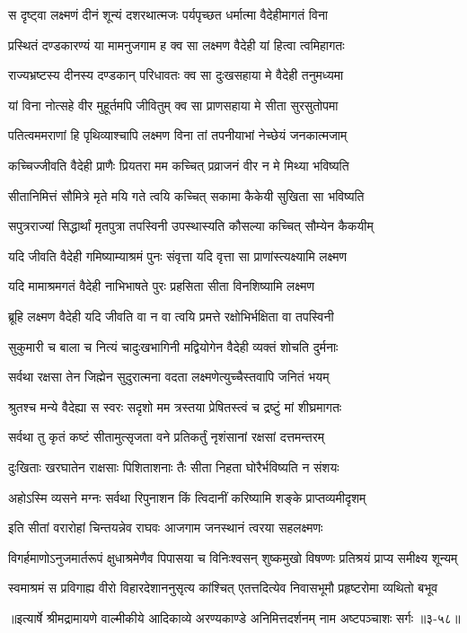 
\twolineshloka
{स दृष्ट्वा लक्ष्मणं दीनं शून्यं दशरथात्मजः}
{पर्यपृच्छत धर्मात्मा वैदेहीमागतं विना} %

\twolineshloka
{प्रस्थितं दण्डकारण्यं या मामनुजगाम ह}
{क्व सा लक्ष्मण वैदेही यां हित्वा त्वमिहागतः} %

\twolineshloka
{राज्यभ्रष्टस्य दीनस्य दण्डकान् परिधावतः}
{क्व सा दुःखसहाया मे वैदेही तनुमध्यमा} %

\twolineshloka
{यां विना नोत्सहे वीर मुहूर्तमपि जीवितुम्}
{क्व सा प्राणसहाया मे सीता सुरसुतोपमा} %

\twolineshloka
{पतित्वममराणां हि पृथिव्याश्चापि लक्ष्मण}
{विना तां तपनीयाभां नेच्छेयं जनकात्मजाम्} %

\twolineshloka
{कच्चिज्जीवति वैदेही प्राणैः प्रियतरा मम}
{कच्चित् प्रव्राजनं वीर न मे मिथ्या भविष्यति} %

\twolineshloka
{सीतानिमित्तं सौमित्रे मृते मयि गते त्वयि}
{कच्चित् सकामा कैकेयी सुखिता सा भविष्यति} %

\twolineshloka
{सपुत्रराज्यां सिद्धार्थां मृतपुत्रा तपस्विनी}
{उपस्थास्यति कौसल्या कच्चित् सौम्येन कैकयीम्} %

\twolineshloka
{यदि जीवति वैदेही गमिष्याम्याश्रमं पुनः}
{संवृत्ता यदि वृत्ता सा प्राणांस्त्यक्ष्यामि लक्ष्मण} %

\twolineshloka
{यदि मामाश्रमगतं वैदेही नाभिभाषते}
{पुरः प्रहसिता सीता विनशिष्यामि लक्ष्मण} %

\twolineshloka
{ब्रूहि लक्ष्मण वैदेही यदि जीवति वा न वा}
{त्वयि प्रमत्ते रक्षोभिर्भक्षिता वा तपस्विनी} %

\twolineshloka
{सुकुमारी च बाला च नित्यं चादुःखभागिनी}
{मद्वियोगेन वैदेही व्यक्तं शोचति दुर्मनाः} %

\twolineshloka
{सर्वथा रक्षसा तेन जिह्मेन सुदुरात्मना}
{वदता लक्ष्मणेत्युच्चैस्तवापि जनितं भयम्} %

\twolineshloka
{श्रुतश्च मन्ये वैदेह्या स स्वरः सदृशो मम}
{त्रस्तया प्रेषितस्त्वं च द्रष्टुं मां शीघ्रमागतः} %

\twolineshloka
{सर्वथा तु कृतं कष्टं सीतामुत्सृजता वने}
{प्रतिकर्तुं नृशंसानां रक्षसां दत्तमन्तरम्} %

\twolineshloka
{दुःखिताः खरघातेन राक्षसाः पिशिताशनाः}
{तैः सीता निहता घोरैर्भविष्यति न संशयः} %

\twolineshloka
{अहोऽस्मि व्यसने मग्नः सर्वथा रिपुनाशन}
{किं त्विदानीं करिष्यामि शङ्के प्राप्तव्यमीदृशम्} %

\twolineshloka
{इति सीतां वरारोहां चिन्तयन्नेव राघवः}
{आजगाम जनस्थानं त्वरया सहलक्ष्मणः} %

\twolineshloka
{विगर्हमाणोऽनुजमार्तरूपं क्षुधाश्रमेणैव पिपासया च}
{विनिःश्वसन् शुष्कमुखो विषण्णः प्रतिश्रयं प्राप्य समीक्ष्य शून्यम्} %

\twolineshloka
{स्वमाश्रमं स प्रविगाह्य वीरो विहारदेशाननुसृत्य कांश्चित्}
{एतत्तदित्येव निवासभूमौ प्रहृष्टरोमा व्यथितो बभूव} %


॥इत्यार्षे श्रीमद्रामायणे वाल्मीकीये आदिकाव्ये अरण्यकाण्डे अनिमित्तदर्शनम् नाम अष्टपञ्चाशः सर्गः ॥३-५८॥
